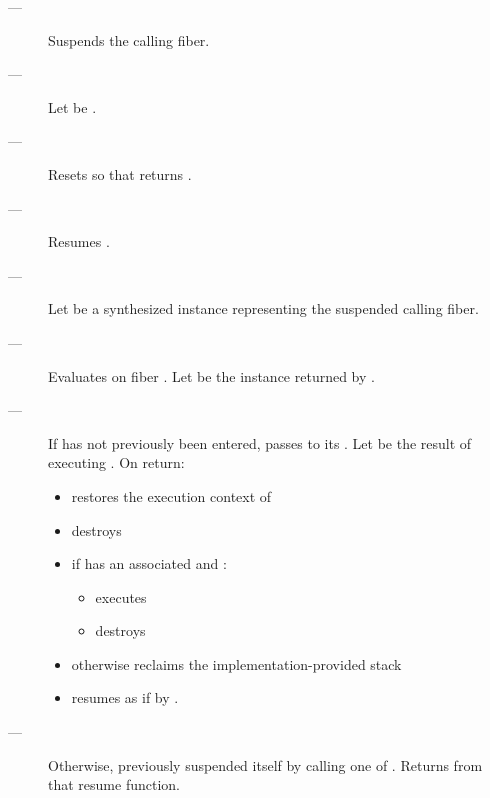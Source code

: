 \effects
\begin{description}
    \item[---] Suspends the calling fiber.
    \item[---] Let  be \thefiber{\state}.
    \item[---] Resets \state so that \emptyfn returns \true.
    \item[---] Resumes .
    \item[---] Let  be a synthesized \fiber instance representing
               the suspended calling fiber.
    \item[---] Evaluates 
               on fiber .
               Let  be the \fiber instance returned by .
    \item[---] If  has not previously been
               entered, passes  to its \entryfn. Let \continuation
               be the result of executing
               . On return:
        \begin{itemize}
            \item restores the execution context of \continuation
            \item destroys 
            \item if  has an associated  and :
                \begin{itemize}
                    \item executes 
                    \item destroys 
                \end{itemize}
            \item otherwise reclaims the implementation-provided stack
            \item resumes \continuation as if by .
        \end{itemize}
    \item[---] Otherwise,  previously
               suspended itself by calling one of \anyresume.
               Returns  from that resume function.
\end{description}

